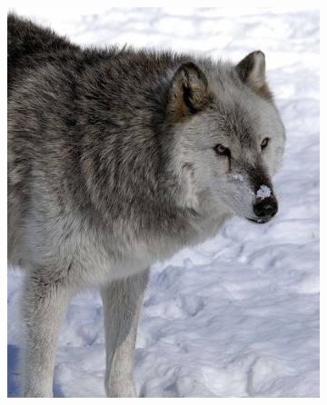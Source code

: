 \begin{figure}[H]
    \centering
    \begin{subfigure}[b]{0.25\textwidth}
        \center
        \includegraphics[width=\textwidth]{Figs/Problem/wolf.jpeg}
        \caption{}\label{fig:interhier1a}
    \end{subfigure}
    \begin{subfigure}[b]{0.20\textwidth}
        \center

\end{subfigure}
\end{figure}
